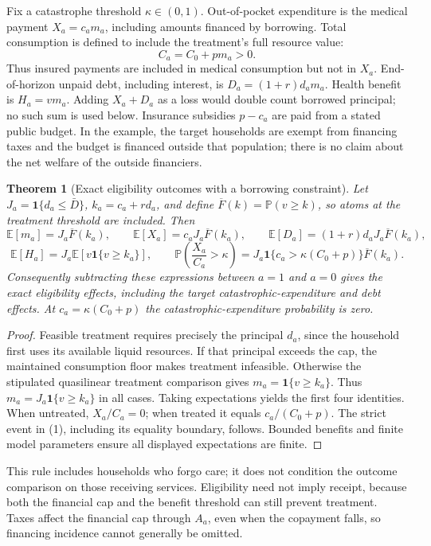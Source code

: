 \documentclass[11pt]{article}
\newtheorem{theorem}{Theorem}
\theoremstyle{remark}\newtheorem{remark}[theorem]{Remark}
\newcommand{\E}{\mathbb E}
\newcommand{\Prb}{\mathbb P}
\newcommand{\ind}{\mathbf 1}
\begin{document}
Fix a catastrophe threshold $\kappa\in(0,1)$. Out-of-pocket expenditure is the medical payment $X_a=c_am_a$, including amounts financed by borrowing. Total consumption is defined to include the treatment's full resource value:
\[
 C_a=C_0+pm_a>0.
\]
Thus insured payments are included in medical consumption but not in $X_a$. End-of-horizon unpaid debt, including interest, is $D_a=(1+r)d_am_a$. Health benefit is $H_a=vm_a$. Adding $X_a+D_a$ as a loss would double count borrowed principal; no such sum is used below. Insurance subsidies $p-c_a$ are paid from a stated public budget. In the example, the target households are exempt from financing taxes and the budget is financed outside that population; there is no claim about the net welfare of the outside financiers.

\begin{theorem}[Exact eligibility outcomes with a borrowing constraint]
Let $J_a=\ind\{d_a\le\bar D\}$, $k_a=c_a+rd_a$, and define $\overline F(k)=\Prb(v\ge k)$, so atoms at the treatment threshold are included. Then
\[
 \E[m_a]=J_a\overline F(k_a),\qquad
 \E[X_a]=c_aJ_a\overline F(k_a),\qquad
 \E[D_a]=(1+r)d_aJ_a\overline F(k_a),
\]
\[
 \E[H_a]=J_a\E[v\ind\{v\ge k_a\}],\qquad
 \Prb\left(\frac{X_a}{C_a}>\kappa\right)
 =J_a\ind\{c_a>\kappa(C_0+p)\}\overline F(k_a).
 \tag{1}
\]
Consequently subtracting these expressions between $a=1$ and $a=0$ gives the exact eligibility effects, including the target catastrophic-expenditure and debt effects. At $c_a=\kappa(C_0+p)$ the catastrophic-expenditure probability is zero.
\end{theorem}
\begin{proof}
Feasible treatment requires precisely the principal $d_a$, since the household first uses its available liquid resources. If that principal exceeds the cap, the maintained consumption floor makes treatment infeasible. Otherwise the stipulated quasilinear treatment comparison gives $m_a=\ind\{v\ge k_a\}$. Thus $m_a=J_a\ind\{v\ge k_a\}$ in all cases. Taking expectations yields the first four identities. When untreated, $X_a/C_a=0$; when treated it equals $c_a/(C_0+p)$. The strict event in (1), including its equality boundary, follows. Bounded benefits and finite model parameters ensure all displayed expectations are finite.
\end{proof}

This rule includes households who forgo care; it does not condition the outcome comparison on those receiving services. Eligibility need not imply receipt, because both the financial cap and the benefit threshold can still prevent treatment. Taxes affect the financial cap through $A_a$, even when the copayment falls, so financing incidence cannot generally be omitted.
\end{document}
